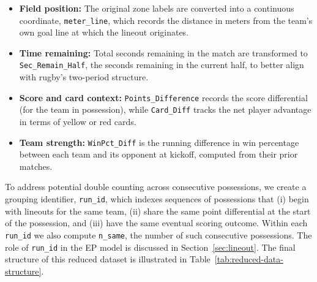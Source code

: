 \documentclass[12pt]{article}
\begin{document}
\begin{itemize}[leftmargin=*]
    \item \textbf{Field position:} The original zone labels are converted into a continuous coordinate, \texttt{meter\_line}, which records the distance in meters from the team's own goal line at which the lineout originates.
    \item \textbf{Time remaining:} Total seconds remaining in the match are transformed to \texttt{Sec\_Remain\_Half}, the seconds remaining in the current half, to better align with rugby's two-period structure.
    \item \textbf{Score and card context:} \texttt{Points\_Difference} records the score differential (for the team in possession), while \texttt{Card\_Diff} tracks the net player advantage in terms of yellow or red cards.
    \item \textbf{Team strength:} \texttt{WinPct\_Diff} is the running difference in win percentage between each team and its opponent at kickoff, computed from their prior matches.
\end{itemize}

To address potential double counting across consecutive possessions, we create a grouping identifier, \texttt{run\_id}, which indexes sequences of possessions that (i) begin with lineouts for the same team, (ii) share the same point differential at the start of the possession, and (iii) have the same eventual scoring outcome. Within each \texttt{run\_id} we also compute \texttt{n\_same}, the number of such consecutive possessions. The role of \texttt{run\_id} in the EP model is discussed in Section~\ref{sec:lineout}. The final structure of this reduced dataset is illustrated in Table~\ref{tab:reduced-data-structure}.
\end{document}
